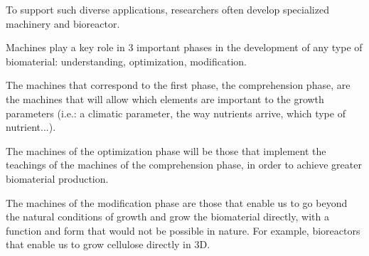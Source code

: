To support such diverse applications, researchers often develop specialized machinery and bioreactor. 

Machines play a key role in 3 important phases in the development of any type of biomaterial: understanding, optimization, modification.

The machines that correspond to the first phase, the comprehension phase, are the machines that will allow which elements are important to the growth parameters (i.e.: a climatic parameter, the way nutrients arrive, which type of nutrient...). 

The machines of the optimization phase will be those that implement the teachings of the machines of the comprehension phase, in order to achieve greater biomaterial production.

The machines of the modification phase are those that enable us to go beyond the natural conditions of growth and grow the biomaterial directly, with a function and form that would not be possible in nature. For example, bioreactors that enable us to grow cellulose directly in 3D. 
